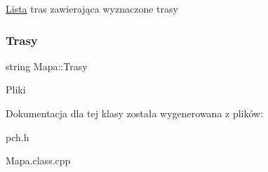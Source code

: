 \mbox{\hyperlink{class_lista}{Lista}} tras zawierająca wyznaczone trasy \mbox{\label{class_mapa_a1c030bb78d2e00479a4a0341540b48fe}} 
\subsubsection{\texorpdfstring{Trasy}{Trasy}}
{\footnotesize\ttfamily string Mapa\+::\+Trasy}

Pliki 

Dokumentacja dla tej klasy została wygenerowana z plików\+:\begin{DoxyCompactItemize}
\item 
pch.\+h\item 
Mapa.\+class.\+cpp\end{DoxyCompactItemize}

